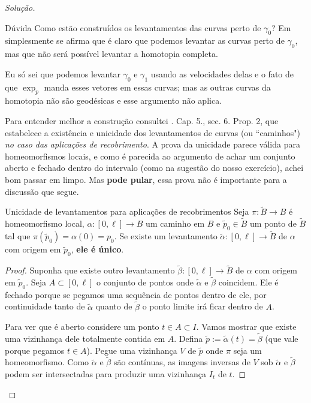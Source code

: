 \begin{proof}[Solução]
\begin{thing7}{Dúvida}\leavevmode
Como estão construídos os levantamentos das curvas perto de \(\gamma_0\)? Em \cite{doc} simplesmente se afirma que é claro que podemos levantar as curvas perto de \(\gamma_0\), mas que não será possível levantar a homotopia completa.

Eu só sei que podemos levantar \(\gamma_0\) e \(\gamma_1\) usando as velocidades delas e o fato de que \(\operatorname{exp}_p\) manda esses vetores em essas curvas; mas as outras curvas da homotopia não são geodésicas e esse argumento não aplica.
\end{thing7}

Para entender melhor a construção consultei \cite{docsu}. Cap. 5., sec. 6. Prop. 2, que estabelece a existência e unicidade dos levantamentos de curvas (ou ``caminhos") \textit{no caso das aplicações de recobrimento}. A prova da unicidade parece válida para homeomorfismos locais, e como é parecida ao argumento de achar um conjunto aberto e fechado dentro do intervalo (como na sugestão do nosso exercício), achei bom passar em limpo. Mas \textbf{pode pular}, essa prova não é importante para a discussão que segue.

\begin{thing7}{Unicidade de levantamentos para aplicações de recobrimentos}\leavevmode
	Seja \(\pi:\tilde{B}\to B\) é homeomorfismo local, \(\alpha:[0,\ell] \to B\) um caminho em \(B\) e \(\tilde{p}_0 \in \tilde{B}\) um ponto de \(\tilde{B}\) tal que \(\pi(\tilde{p}_0)=\alpha(0)=p_0\). Se existe um levantamento \(\tilde{\alpha}:[0,\ell] \to \tilde{B}\) de \(\alpha\) com origem em \(\tilde{p}_0\), \textbf{ele é único}.
\end{thing7}

\begin{proof}\leavevmode
	Suponha que existe outro levantamento \(\tilde{\beta}:[0,\ell] \to \tilde{B}\) de \(\alpha\) com origem em \(\tilde{p}_0\). Seja \(A \subset[0,\ell]\) o conjunto de pontos onde \(\tilde{\alpha}\) e \(\tilde{\beta}\) coincidem. Ele é fechado porque se pegamos uma sequência de pontos dentro de ele, por continuidade tanto de \(\tilde{\alpha}\) quanto de \(\tilde{\beta}\) o ponto limite irá ficar dentro de \(A\).

	Para ver que é aberto considere um ponto \(t \in A \subset I\). Vamos mostrar que existe uma vizinhança dele totalmente contida em \(A\). Defina \(\tilde{p}:=\tilde{\alpha}(t)=\tilde{\beta}\) (que vale porque pegamos \(t \in A\)). Pegue uma vizinhança \(V\) de \(\tilde{p}\) onde \(\pi\) seja um homeomorfismo. Como \(\tilde{\alpha}\) e \(\tilde{\beta}\) são contínuas, as imagens inversas de \(V\) sob \(\tilde{\alpha}\) e \(\tilde{\beta}\) podem ser intersectadas para produzir uma vizinhança \(I_t\) de \(t\).


\end{proof}
\end{proof}
